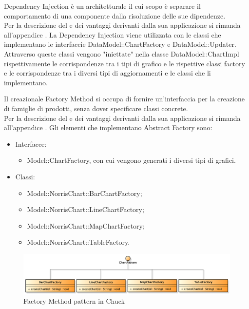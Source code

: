 			Dependency Injection è un  architetturale il cui scopo è separare il comportamento di una componente dalla risoluzione delle sue dipendenze.\\
			Per la descrizione del  e dei vantaggi derivanti dalla sua applicazione si rimanda all'appendice .
				La Dependency Injection viene utilizzata con le classi che implementano le interfaccie DataModel::ChartFactory e DataModel::Updater. Attraverso queste classi vengono "iniettate" nella classe DataModel::ChartImpl rispettivamente le corrispondenze tra i tipi di grafico e le rispettive classi factory e le corrispondenze tra i diversi tipi di aggiornamenti e le classi che li implementano.
		
			Il  creazionale Factory Method si occupa di fornire un'interfaccia per la creazione di famiglie di prodotti, senza dover specificare classi concrete. \\
			Per la descrizione del  e dei vantaggi derivanti dalla sua applicazione si rimanda all'appendice .
				Gli elementi che implementano Abstract Factory sono:
				\begin{itemize}
				\item Interfacce:
					\begin{itemize}
						\item Model::ChartFactory, con cui vengono generati i diversi tipi di grafici.
					\end{itemize}
				\item Classi:
					\begin{itemize}
						\item Model::NorrisChart::BarChartFactory;
						\item Model::NorrisChart::LineChartFactory;
						\item Model::NorrisChart::MapChartFactory;
						\item Model::NorrisChart::TableFactory.
					\end{itemize}
				\end{itemize}
				\begin{figure}[H]\centering
	        		\includegraphics[width=\textwidth]{SpecificaTecnica/Pics/DesignPatternNorris/Factory2}
	        		\caption{Factory Method pattern in Chuck}
	    			\end{figure}
				

